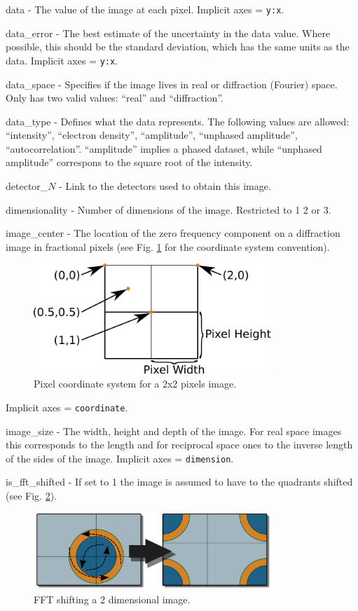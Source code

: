 \documentclass[usletter,11pt]{article}
\newcommand{\member}[2]
{ \noindent
{ \color{softBlue}  #1 - } #2
\vspace{0.2cm}
}
\begin{document}
\member{data}{The value of the image at each pixel. Implicit axes = {\tt y:x}.}

\member{data\_error}{The best estimate of the uncertainty in the data
 value. Where possible, this should be the standard deviation, which
 has the same units as the data. Implicit axes = {\tt y:x}.}

\member{data\_space}{Specifies if the image lives in real or diffraction (Fourier)
 space. Only has two valid values: ``real'' and ``diffraction''. }

\member{data\_type}{Defines what the data represents. The following
  values are allowed: ``intensity'', ``electron density'',
  ``amplitude'', ``unphased amplitude'',
  ``autocorrelation''. ``amplitude'' implies a phased dataset, while
  ``unphased amplitude'' correspons to the square root of the intensity.}

\member{detector\_$N$}{Link to the detectors used to obtain this
image.}

\member{dimensionality}{Number of dimensions of the image. Restricted to 1 2 or 3.}

\member{image\_center}{The location of the zero frequency component on
 a diffraction image in fractional pixels  (see
 Fig. \ref{fig:pixel_coordinates} for the coordinate system convention).

\begin{figure}[h!]
\centering
\includegraphics[width=0.8\textwidth]{pixel_coordinates.pdf}
\caption{Pixel coordinate system for a 2x2 pixels image.}
\label{fig:pixel_coordinates}
\end{figure}

Implicit axes = {\tt coordinate}.
}


\member{image\_size}{The width, height and depth of the image. For
  real space images this corresponds to the length and for reciprocal
  space ones to the inverse length of the sides of the image. Implicit axes = {\tt dimension}.}

\member{is\_fft\_shifted}{If set to 1 the image is assumed to have to
  the quadrants shifted (see Fig. \ref{fig:fft_shift}).

\begin{figure}[h!]
\centering
\includegraphics[width=0.8\textwidth]{fft_shift.pdf}
\caption{FFT shifting a 2 dimensional image.}
\label{fig:fft_shift}
\end{figure}
}
\end{document}
